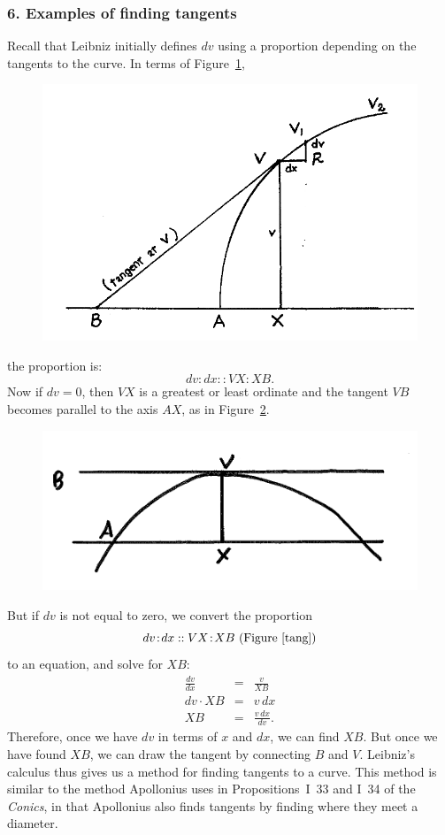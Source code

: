 \documentclass[polutonikogreek,english,twoside,openright]{article}
\begin{document}
\subsubsection*{6. Examples of finding tangents}
Recall that Leibniz initially defines $dv$ using a proportion
depending on the tangents to the curve.  In terms of
Figure~\ref{tang},
\begin{figure}[htp]
\begin{center}
\includegraphics[width=.85\textwidth]{fig/Figure16}
\caption{}
\label{tang}
\vspace{-10pt}
\end{center}
\end{figure}
the proportion is:
$$dv \!:\! dx :: VX \!:\! XB.$$
Now if $dv=0$, then $VX$ is a greatest or least ordinate and the tangent $VB$ becomes parallel to the axis $AX$, as in Figure~\ref{htang}.
\begin{figure}[htp]
\begin{center}
\includegraphics[width=.75\textwidth]{fig/Figure16A}
\caption{}
\label{htang}
\vspace{-10pt}
\end{center}
\end{figure}


But if $dv$ is not equal to zero, we convert the proportion
$$dv \!:\! dx :: VX \!:\! XB \mbox{ (Figure~\ref{tang})}$$
 to an equation, and solve for $XB$:
\setlength{\jot}{1.5ex}
\begin{eqnarray*}
\frac{dv}{dx} & = & \frac{v}{XB} \\
dv \cdot XB & = & v\,dx\\
XB &= &\frac{v\,dx}{dv}.
\end{eqnarray*}
Therefore, once we have $dv$ in terms of $x$ and $dx$, we can find
$XB$.  But once we have found $XB$, we can draw the tangent by
connecting $B$ and $V$.  Leibniz's calculus thus gives us a method for
finding tangents to a curve.  This method is similar to the method
Apollonius uses in Propositions~I~33 and I~34 of the {\em Conics}, in
that Apollonius also finds tangents by finding where they meet a
diameter. 
\end{document}
